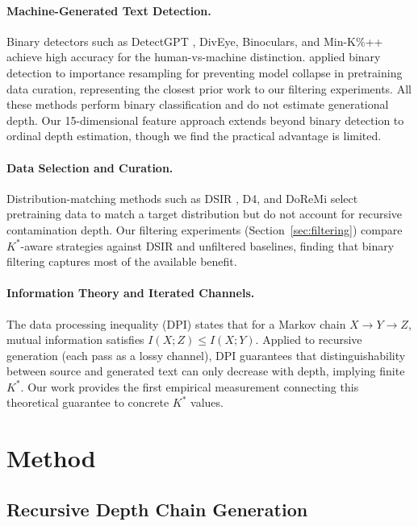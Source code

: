 \documentclass[11pt]{article}
\newcommand{\kstar}{K^*}
\begin{document}
\paragraph{Machine-Generated Text Detection.}
Binary detectors such as DetectGPT \citep{mitchell2023detectgpt}, DivEye, Binoculars, and Min-K\%++ achieve high accuracy for the human-vs-machine distinction.
\citet{drayson2025preventing} applied binary detection to importance resampling for preventing model collapse in pretraining data curation, representing the closest prior work to our filtering experiments.
All these methods perform binary classification and do not estimate generational depth.
Our 15-dimensional feature approach extends beyond binary detection to ordinal depth estimation, though we find the practical advantage is limited.

\paragraph{Data Selection and Curation.}
Distribution-matching methods such as DSIR \citep{xie2023data}, D4, and DoReMi select pretraining data to match a target distribution but do not account for recursive contamination depth.
Our filtering experiments (Section~\ref{sec:filtering}) compare $\kstar$-aware strategies against DSIR and unfiltered baselines, finding that binary filtering captures most of the available benefit.

\paragraph{Information Theory and Iterated Channels.}
The data processing inequality (DPI) states that for a Markov chain $X \to Y \to Z$, mutual information satisfies $I(X;Z) \leq I(X;Y)$.
Applied to recursive generation (each pass as a lossy channel), DPI guarantees that distinguishability between source and generated text can only decrease with depth, implying finite $\kstar$.
Our work provides the first empirical measurement connecting this theoretical guarantee to concrete $\kstar$ values.


\section{Method}
\label{sec:method}

\subsection{Recursive Depth Chain Generation}
\end{document}
